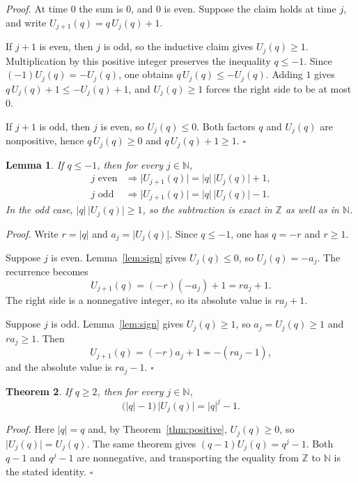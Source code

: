 \documentclass[11pt,letterpaper]{article}
\newcommand{\N}{\mathbb{N}}
\newcommand{\Z}{\mathbb{Z}}
\newtheorem{theorem}{Theorem}
\newtheorem{lemma}[theorem]{Lemma}
\newenvironment{proof}{\noindent\textit{Proof.}}{\hfill\(\square\)}
\begin{document}
\begin{proof}
At time \(0\) the sum is \(0\), and \(0\) is even. Suppose the claim holds at time \(j\), and write \(U_{j+1}(q)=q\,U_j(q)+1\).

If \(j+1\) is even, then \(j\) is odd, so the inductive claim gives \(U_j(q)\ge 1\). Multiplication by this positive integer preserves the inequality \(q\le -1\). Since \((-1)U_j(q)=-U_j(q)\), one obtains \(q\,U_j(q)\le -U_j(q)\). Adding \(1\) gives \(q\,U_j(q)+1\le -U_j(q)+1\), and \(U_j(q)\ge 1\) forces the right side to be at most \(0\).

If \(j+1\) is odd, then \(j\) is even, so \(U_j(q)\le 0\). Both factors \(q\) and \(U_j(q)\) are nonpositive, hence \(q\,U_j(q)\ge 0\) and \(q\,U_j(q)+1\ge 1\).
\end{proof}

\begin{lemma}
\label{lem:abs-step}
If \(q\le -1\), then for every \(j\in\N\),
\begin{align*}
j\text{ even}&\Longrightarrow
\bigl|U_{j+1}(q)\bigr|=|q|\,\bigl|U_j(q)\bigr|+1,\\
j\text{ odd}&\Longrightarrow
\bigl|U_{j+1}(q)\bigr|=|q|\,\bigl|U_j(q)\bigr|-1.
\end{align*}
In the odd case, \(|q|\,\bigl|U_j(q)\bigr|\ge 1\), so the subtraction is exact in \(\Z\) as well as in \(\N\).
\end{lemma}

\begin{proof}
Write \(r=|q|\) and \(a_j=\bigl|U_j(q)\bigr|\). Since \(q\le -1\), one has \(q=-r\) and \(r\ge 1\).

Suppose \(j\) is even. Lemma~\ref{lem:sign} gives \(U_j(q)\le 0\), so \(U_j(q)=-a_j\). The recurrence becomes
\[
U_{j+1}(q)=(-r)(-a_j)+1=ra_j+1.
\]
The right side is a nonnegative integer, so its absolute value is \(ra_j+1\).

Suppose \(j\) is odd. Lemma~\ref{lem:sign} gives \(U_j(q)\ge 1\), so \(a_j=U_j(q)\ge 1\) and \(ra_j\ge 1\). Then
\[
U_{j+1}(q)=(-r)a_j+1=-(ra_j-1),
\]
and the absolute value is \(ra_j-1\).
\end{proof}

\begin{theorem}
\label{thm:geometric-pos}
If \(q\ge 2\), then for every \(j\in\N\),
\[
\bigl(|q|-1\bigr)\,\bigl|U_j(q)\bigr|=|q|^j-1.
\]
\end{theorem}

\begin{proof}
Here \(|q|=q\) and, by Theorem~\ref{thm:positive}, \(U_j(q)\ge 0\), so \(\bigl|U_j(q)\bigr|=U_j(q)\). The same theorem gives \((q-1)U_j(q)=q^j-1\). Both \(q-1\) and \(q^j-1\) are nonnegative, and transporting the equality from \(\Z\) to \(\N\) is the stated identity.
\end{proof}
\end{document}
